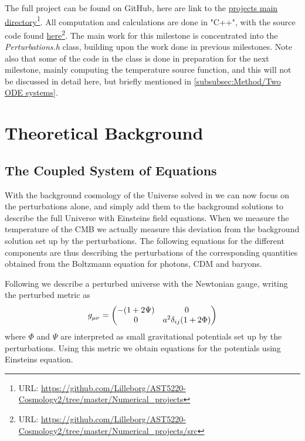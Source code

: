 \documentclass[10pt,a4paper]{article}
\providecommand{\rCDM}
{\ensuremath{
\textrm{CDM}
}
}
\begin{document}
The full project can be found on GitHub, here are link to the \href{https://github.com/Lilleborg/AST5220-Cosmology2/tree/master/Numerical_projects}{projects main directory}\footnote{URL: \url{https://github.com/Lilleborg/AST5220-Cosmology2/tree/master/Numerical_projects}}. All computation and calculations are done in "C++", with the source code found \href{https://github.com/Lilleborg/AST5220-Cosmology2/tree/master/Numerical_projects/src}{here}\footnote{URL: \url{https://github.com/Lilleborg/AST5220-Cosmology2/tree/master/Numerical_projects/src}}. The main work for this milestone is concentrated into the \textit{Perturbations.h} class, building upon the work done in previous milestones. Note also that some of the code in the class is done in preparation for the next milestone, mainly computing the temperature source function, and this will not be discussed in detail here, but briefly mentioned in \cref{subsubsec:Method/Two ODE systems}.

\section{Theoretical Background}
\label{sec:Theory}

\subsection{The Coupled System of Equations}
\label{subsec:Theory/Coupled equations}

With the background cosmology of the Universe solved in \cite{milestone1} we can now focus on the perturbations alone, and simply add them to the background solutions to describe the full Universe with Einsteins field equations. When we measure the temperature of the CMB we actually measure this deviation from the background solution set up by the perturbations. The following equations for the different components are thus describing the perturbations of the corresponding quantities obtained from the Boltzmann equation for photons, \rCDM and baryons.

Following \cite{Calin} we describe a perturbed universe with the Newtonian gauge, writing the perturbed metric as 
\begin{equation}
\tensor{g}{_\mu_\nu} =
  \begin{pmatrix}
    -(1+2\Psi) & 0
    \\
    0 & a^2\delta_{ij}(1+2\Phi)
  \end{pmatrix}
\end{equation}
where $\Phi$ and $\Psi$ are interpreted as small gravitational potentials set up by the perturbations. Using this metric we obtain equations for the potentials using Einsteins equation.
\end{document}
